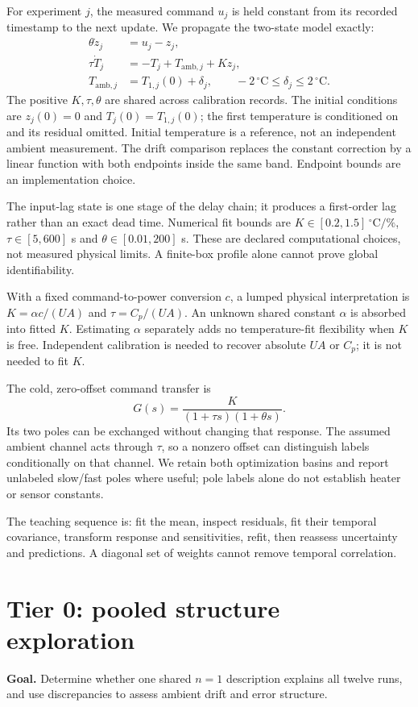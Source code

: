 \documentclass[10pt,letterpaper]{article}
\newcommand{\C}{\,^\circ\mathrm{C}}
\begin{document}
For experiment $j$, the measured command $u_j$ is held constant from its recorded timestamp to the next update. We propagate the two-state model exactly:
\begin{align}
\theta\dot z_j &= u_j-z_j,\\
\tau\dot T_j &= -T_j+T_{\mathrm{amb},j}+Kz_j,\\
T_{\mathrm{amb},j} &= T_{1,j}(0)+\delta_j,\qquad -2\C\leq\delta_j\leq2\C.
\end{align}
The positive $K,\tau,\theta$ are shared across calibration records. The initial conditions are $z_j(0)=0$ and $T_j(0)=T_{1,j}(0)$; the first temperature is conditioned on and its residual omitted. Initial temperature is a reference, not an independent ambient measurement. The drift comparison replaces the constant correction by a linear function with both endpoints inside the same band. Endpoint bounds are an implementation choice.

The input-lag state is one stage of the delay chain; it produces a first-order lag rather than an exact dead time. Numerical fit bounds are $K\in[0.2,1.5]\C/\%$, $\tau\in[5,600]$ s and $\theta\in[0.01,200]$ s. These are declared computational choices, not measured physical limits. A finite-box profile alone cannot prove global identifiability.

With a fixed command-to-power conversion $c$, a lumped physical interpretation is $K=\alpha c/(UA)$ and $\tau=C_p/(UA)$. An unknown shared constant $\alpha$ is absorbed into fitted $K$. Estimating $\alpha$ separately adds no temperature-fit flexibility when $K$ is free. Independent calibration is needed to recover absolute $UA$ or $C_p$; it is not needed to fit $K$.

The cold, zero-offset command transfer is
\[
G(s)=\frac{K}{(1+\tau s)(1+\theta s)}.
\]
Its two poles can be exchanged without changing that response. The assumed ambient channel acts through $\tau$, so a nonzero offset can distinguish labels conditionally on that channel. We retain both optimization basins and report unlabeled slow/fast poles where useful; pole labels alone do not establish heater or sensor constants.

The teaching sequence is: fit the mean, inspect residuals, fit their temporal covariance, transform response and sensitivities, refit, then reassess uncertainty and predictions. A diagonal set of weights cannot remove temporal correlation.

\section{Tier 0: pooled structure exploration}
\textbf{Goal.} Determine whether one shared $n=1$ description explains all twelve runs, and use discrepancies to assess ambient drift and error structure.
\end{document}
